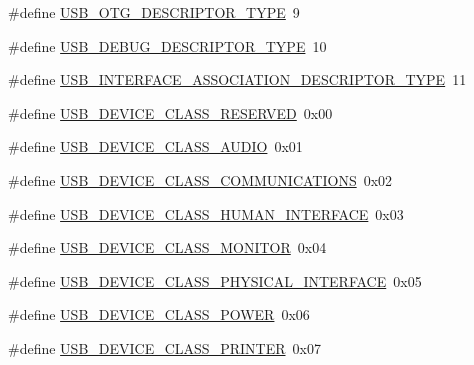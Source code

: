 \begin{DoxyCompactItemize}
\item 
\#define \hyperlink{group___u_s_b_d___core_ga0e105187070c79d5843dde5503bb78f2}{U\+S\+B\+\_\+\+O\+T\+G\+\_\+\+D\+E\+S\+C\+R\+I\+P\+T\+O\+R\+\_\+\+T\+Y\+PE}~9
\item 
\#define \hyperlink{group___u_s_b_d___core_ga9d5ac46d5f303464ac827d63f9da984e}{U\+S\+B\+\_\+\+D\+E\+B\+U\+G\+\_\+\+D\+E\+S\+C\+R\+I\+P\+T\+O\+R\+\_\+\+T\+Y\+PE}~10
\item 
\#define \hyperlink{group___u_s_b_d___core_ga2ab1841a48da627b702526b01eb31268}{U\+S\+B\+\_\+\+I\+N\+T\+E\+R\+F\+A\+C\+E\+\_\+\+A\+S\+S\+O\+C\+I\+A\+T\+I\+O\+N\+\_\+\+D\+E\+S\+C\+R\+I\+P\+T\+O\+R\+\_\+\+T\+Y\+PE}~11
\end{DoxyCompactItemize}
\begin{DoxyCompactItemize}
\item 
\#define \hyperlink{group___u_s_b_d___core_gaca7ece737f3f37b7a6f458fc24864776}{U\+S\+B\+\_\+\+D\+E\+V\+I\+C\+E\+\_\+\+C\+L\+A\+S\+S\+\_\+\+R\+E\+S\+E\+R\+V\+ED}~0x00
\item 
\#define \hyperlink{group___u_s_b_d___core_gade360faee3b601af707b65122a46d446}{U\+S\+B\+\_\+\+D\+E\+V\+I\+C\+E\+\_\+\+C\+L\+A\+S\+S\+\_\+\+A\+U\+D\+IO}~0x01
\item 
\#define \hyperlink{group___u_s_b_d___core_gab6fd7e18adf5c748a6b56391c1c2b819}{U\+S\+B\+\_\+\+D\+E\+V\+I\+C\+E\+\_\+\+C\+L\+A\+S\+S\+\_\+\+C\+O\+M\+M\+U\+N\+I\+C\+A\+T\+I\+O\+NS}~0x02
\item 
\#define \hyperlink{group___u_s_b_d___core_ga3d9e0560a81b4dfd30bbf829960dbfab}{U\+S\+B\+\_\+\+D\+E\+V\+I\+C\+E\+\_\+\+C\+L\+A\+S\+S\+\_\+\+H\+U\+M\+A\+N\+\_\+\+I\+N\+T\+E\+R\+F\+A\+CE}~0x03
\item 
\#define \hyperlink{group___u_s_b_d___core_ga23d001aa49fada2019ff3a4886a9f2a5}{U\+S\+B\+\_\+\+D\+E\+V\+I\+C\+E\+\_\+\+C\+L\+A\+S\+S\+\_\+\+M\+O\+N\+I\+T\+OR}~0x04
\item 
\#define \hyperlink{group___u_s_b_d___core_ga6053794e5de119b37615ec98f7eceedb}{U\+S\+B\+\_\+\+D\+E\+V\+I\+C\+E\+\_\+\+C\+L\+A\+S\+S\+\_\+\+P\+H\+Y\+S\+I\+C\+A\+L\+\_\+\+I\+N\+T\+E\+R\+F\+A\+CE}~0x05
\item 
\#define \hyperlink{group___u_s_b_d___core_ga88a8b2d45b2950ffd5654e4c3b6741ff}{U\+S\+B\+\_\+\+D\+E\+V\+I\+C\+E\+\_\+\+C\+L\+A\+S\+S\+\_\+\+P\+O\+W\+ER}~0x06
\item 
\#define \hyperlink{group___u_s_b_d___core_gae6181c6bdb18c0e6491dd189983b6bd2}{U\+S\+B\+\_\+\+D\+E\+V\+I\+C\+E\+\_\+\+C\+L\+A\+S\+S\+\_\+\+P\+R\+I\+N\+T\+ER}~0x07
\item 

\end{DoxyCompactItemize}
